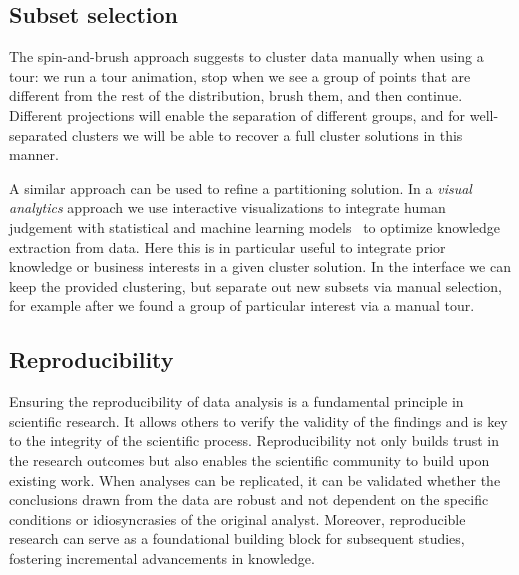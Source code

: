 \documentclass[article]{ajs}
\begin{document}



\subsection{Subset selection}

The spin-and-brush approach suggests to cluster data manually when using a tour: we run a tour animation, stop when we see a group of points that are different from the rest of the distribution, brush them, and then continue. Different projections will enable the separation of different groups, and for well-separated clusters we will be able to recover a full cluster solutions in this manner.

A similar approach can be used to refine a partitioning solution. In a \textit{visual analytics} approach we use interactive visualizations to integrate human judgement with statistical and machine learning models~\citep{keim2010mastering} to optimize knowledge extraction from data.
Here this is in particular useful to integrate prior knowledge or business interests in a given cluster solution. In the interface we can keep the provided clustering, but separate out new subsets via manual selection, for example after we found a group of particular interest via a manual tour.

\subsection{Reproducibility}

Ensuring the reproducibility of data analysis is a fundamental principle in scientific research. It allows others to verify the validity of the findings and is key to the integrity of the scientific process. Reproducibility not only builds trust in the research outcomes but also enables the scientific community to build upon existing work. When analyses can be replicated, it can be validated whether the conclusions drawn from the data are robust and not dependent on the specific conditions or idiosyncrasies of the original analyst. Moreover, reproducible research can serve as a foundational building block for subsequent studies, fostering incremental advancements in knowledge.
\end{document}

